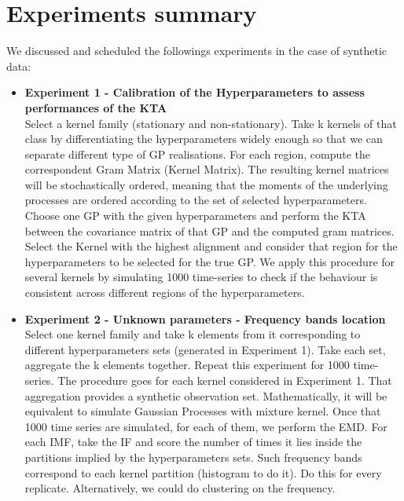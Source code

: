 \documentclass[11pt, a4paper]{article} %
\begin{document}
\section*{Experiments summary}
We discussed and scheduled the followings experiments in the case of synthetic data:
\begin{itemize}
\item \textbf{Experiment 1 - Calibration of the Hyperparameters to assess performances of the KTA}\\
Select a kernel family (stationary and non-stationary). Take k kernels of that class by differentiating the hyperparameters widely enough so that we can separate different type of GP realisations. For each region, compute the correspondent Gram Matrix (Kernel Matrix). The resulting kernel matrices will be stochastically ordered, meaning that the moments of the underlying processes are ordered according to the set of selected hyperparameters. Choose one GP with the given hyperparameters and perform the KTA between the covariance matrix of that GP and the computed gram matrices. Select the Kernel with the highest alignment and consider that region for the hyperparameters to be selected for the true GP. We apply this procedure for several kernels by simulating 1000 time-series to check if the behaviour is consistent across different regions of the hyperparameters.

\item \textbf{Experiment 2 - Unknown parameters - Frequency bands location\\}
Select one kernel family and take k elements from it corresponding to different hyperparameters sets (generated in Experiment 1). Take each set, aggregate the k elements together. Repeat this experiment for 1000 time-series. The procedure goes for each kernel considered in Experiment 1. That aggregation provides a synthetic observation set. Mathematically, it will be equivalent to simulate Gaussian Processes with mixture kernel. Once that 1000 time series are simulated, for each of them, we perform the EMD. For each IMF, take the IF and score the number of times it lies inside the partitions implied by the hyperparameters sets. Such frequency bands correspond to each kernel partition (histogram to do it). Do this for every replicate. Alternatively, we could do clustering on the frequency. 


\end{itemize}
\end{document}
